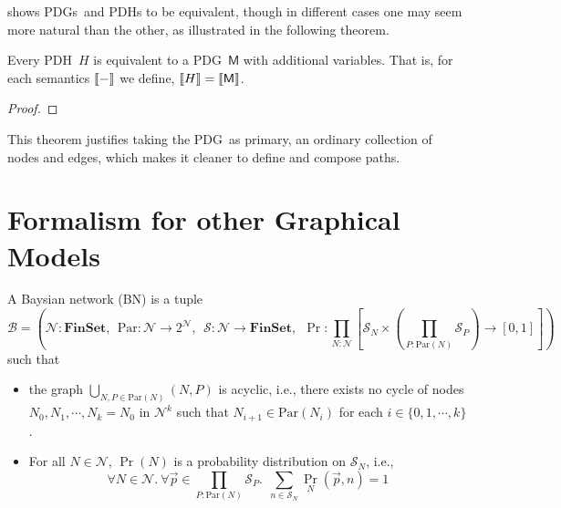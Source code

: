 \documentclass{article}
\newcommand{\sfM}{\mathsf M}
\newcommand{\MN}{PDG}
\newcommand{\MNH}{PDH}
\newcommand{\MNs}{\MN s}
\numberwithin{equation}{section}
\begin{document}
	 shows \MNs\ and \MNH s to be equivalent, though in different cases one may seem more natural than the other, as illustrated in the following theorem.
	
	\begin{theorem}[restate=thmhyperequiv]\label{thm:hyperequiv}
		Every \MNH\ $H$ is equivalent to a \MN\ $\sfM$ with additional variables. That is, for each semantics $\llbracket-\rrbracket$ we define, $\bbr{H} = \bbr{\sfM}$.
	\end{theorem}
	\begin{proof}
		\todo{}
	\end{proof}
	
	This theorem justifies taking the \MN\ as primary, an ordinary collection of nodes and edges, which makes it cleaner to define and compose paths. 

	
	\section{Formalism for other Graphical Models}
	\begin{defn}
		A Baysian network (BN) is a tuple
		\[
		\mathcal B = \left(\mathcal N : \mathbf{FinSet}, ~~\mathrm{Par}: \mathcal N \to 2^{\mathcal N},~~ \mathcal S: \mathcal N \to \mathbf{FinSet},~~\Pr: \prod_{N : \mathcal N}  \left[ \mathcal S_N \times \left(\prod_{P : \mathrm{Par}(N)} \mathcal S_P\right)  \to [0,1] \right] \right)
		\]
		such that
		\begin{itemize}[nosep]
			\item the graph $\bigcup_{N, P \in \mathrm{Par}(N)}(N, P)$ is acyclic, i.e., there exists no cycle of nodes $N_0, N_1, \cdots, N_k = N_0$ in $\mathcal N^k$ such that $N_{i+1} \in \mathrm{Par}(N_i)$ for each $i \in \{0, 1, \cdots, k\}$.
			\item For all $N \in \mathcal N$, $\Pr(N)$ is a probability distribution on $\mathcal S_N$, i.e., 
			\[ \forall N\in \mathcal N.~\forall \vec{p} \in {\prod_{P : \mathrm{Par}(N)} \mathcal S_P}.~~ \sum_{n \in \mathcal S_{N}} \Pr_N(\vec{p}, n) = 1\]
		\end{itemize}
	\end{defn}
	
\end{document}
